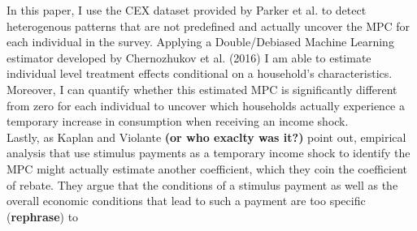 In this paper, I use the CEX dataset provided by Parker et al. to detect heterogenous patterns that are not predefined and actually uncover the MPC for each individual in the survey. Applying a Double/Debiased Machine Learning estimator developed by Chernozhukov et al. (2016) I am able to estimate individual level treatment effects conditional on a household's characteristics. Moreover, I can quantify whether this estimated MPC is significantly different from zero for each individual to uncover which households actually experience a temporary increase in consumption when receiving an income shock. \\
Lastly, as Kaplan and Violante \textbf{(or who exaclty was it?)} point out, empirical analysis that use stimulus payments as a temporary income shock to identify the MPC might actually estimate another coefficient, which they coin the coefficient of rebate. They argue that the conditions of a stimulus payment as well as the overall economic conditions that lead to such a payment are too specific (\textbf{rephrase}) to 